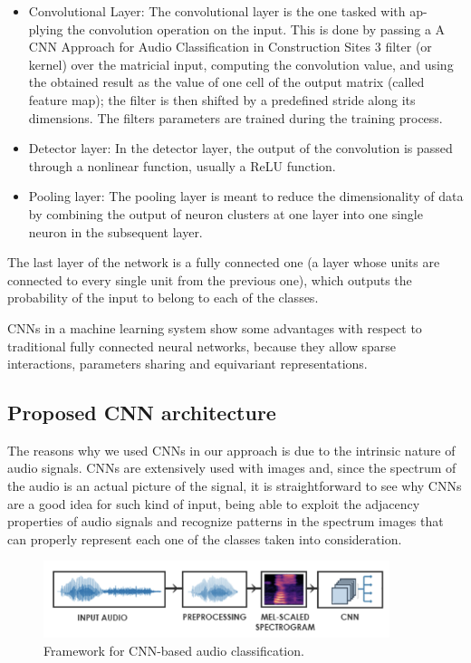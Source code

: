 \documentclass[english, LaM, oneside]{sapthesis}%
\begin{document}
\begin{itemize}
    \item Convolutional Layer: The convolutional layer is the one tasked with ap- plying the convolution operation on the input. This is done by passing a A CNN Approach for Audio Classification in Construction Sites 3 filter (or kernel) over the matricial input, computing the convolution value, and using the obtained result as the value of one cell of the output matrix (called feature map); the filter is then shifted by a predefined stride along its dimensions. The filters parameters are trained during the training process.
    \item Detector layer: In the detector layer, the output of the convolution is passed through a nonlinear function, usually a ReLU function.
    \item Pooling layer: The pooling layer is meant to reduce the dimensionality of data by combining the output of neuron clusters at one layer into one single neuron in the subsequent layer.
\end{itemize}
The last layer of the network is a fully connected one (a layer whose units are connected to every single unit from the previous one), which outputs the probability of the input to belong to each of the classes.


CNNs in a machine learning system show some advantages with respect to traditional fully connected neural networks, because they allow sparse interactions, parameters sharing and equivariant representations.

\subsection{Proposed CNN architecture}
The reasons why we used CNNs in our approach is due to the intrinsic nature of audio signals. CNNs are extensively used with images and, since the spectrum of the audio is an actual picture of the signal, it is straightforward to see why CNNs are a good idea for such kind of input, being able to exploit the adjacency properties of audio signals and recognize patterns in the spectrum images that can properly represent each one of the classes taken into consideration.

\begin{figure}[h]
            \centering
            \includegraphics[width=0.90\textwidth]{audio_cnn.png}
            \caption{Framework for CNN-based audio classification.}
            \label{fig:cnn-audio}
\end{figure}
\end{document}

